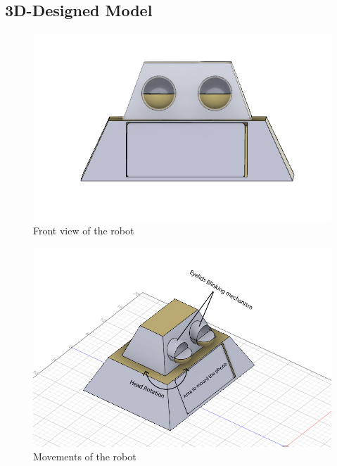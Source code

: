 \documentclass{fisatproject}
\begin{document}
\subsection{3D-Designed Model}
\begin{figure}[H]
\centerline{\includegraphics[scale=0.70]{sad.PNG}}
\caption{Front view of the robot}
\end{figure}
\begin{figure}[H]
\centerline{\includegraphics[scale=0.70]{side_label.jpg}}
\caption{Movements of the robot}
\end{figure}
\newpage
\end{document}
